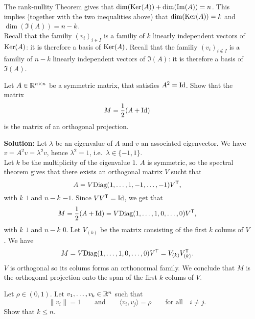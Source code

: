 \documentclass[11pt,nocut]{article}
\begin{document}
The rank-nullity Theorem gives that ${{\rm dim}}({{\rm Ker}}(A)) + {{\rm dim}}({{\rm Im}}(A)) = n$. This implies (together with the two inequalities above) that
${{\rm dim}}({{\rm Ker}}(A)) = k$ and $\dim(\Im(A)) = n-k$.
\\

Recall that the familiy $(v_i)_{i \in I}$ is a familiy of $k$ linearly independent vectors of ${{\rm Ker}}(A)$: it is therefore a basis of ${{\rm Ker}}(A)$.
Recall that the familiy $(v_i)_{i \not\in I}$ is a familiy of $n-k$ linearly independent vectors of $\Im(A)$: it is therefore a basis of $\Im(A)$.


\vspace{0.2cm}
\begin{problem}
	Let $A\in \mathbb{R}^{n \times n}$ be a symmetric matrix, that satisfies $A^2 = {{\rm Id}}$.
	Show that the matrix 
	$$
	M = \frac{1}{2}(A+{{\rm Id}})
	$$
	is the matrix of an orthogonal projection.
\end{problem}
\textbf{Solution:}
Let $\lambda$ be an eigenvalue of $A$ and $v$ an associated eigenvector. We have $v = A^2 v = \lambda^2 v$, hence $\lambda^2 = 1$, i.e.\ $\lambda \in \{-1,1\}$.
\\

Let $k$ be the multiplicity of the eigenvalue $1$. $A$ is symmetric, so the spectral theorem gives that there exists an orthogonal matrix $V$ sucht that
$$
A = V {{\rm Diag}}(1, \dots, 1, -1, \dots, -1) V^{{\sf T}},
$$
with $k$ $1$ and $n-k$ $-1$. Since $VV^{{\sf T}} = {{\rm Id}}$, we get that
	$$
	M = \frac{1}{2}(A+{{\rm Id}})
= V {{\rm Diag}}(1, \dots, 1, 0, \dots, 0) V^{{\sf T}},
	$$
with $k$ $1$ and $n-k$ $0$.
Let $V_{(k)}$ be the matrix consisting of the first $k$ colums of $V$. We have
	$$
	M=V {{\rm Diag}}(1, \dots, 1, 0, \dots, 0) V^{{\sf T}} = V_{(k)} V_{(k)}^{{\sf T}}.
	$$
	$V$ is orthogonal so its colums forms an orthonormal family. We conclude that $M$ is the orthogonal projection onto the span of the first $k$ colums of $V$.

\vspace{0.2cm}

\begin{problem}
	Let $\rho \in (0,1)$.
	Let $v_1, \dots, v_k \in \mathbb{R}^n$ such that
	$$
\|v_i\| = 1
\qquad \text{and} \qquad
\langle v_i, v_j \rangle = \rho
\qquad \text{for all} \quad i \neq j.
	$$
	Show that $k \leq n$.
\end{problem}
\end{document}
